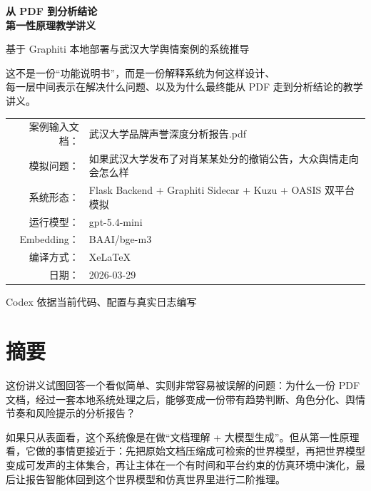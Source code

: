 \documentclass[UTF8,10pt,oneside]{ctexbook}
\begin{document}
\frontmatter

\begin{titlepage}
\centering
\vspace*{2.5cm}
{\Huge\bfseries 从 PDF 到分析结论\\[0.4em]第一性原理教学讲义\par}
\vspace{1cm}
{\Large 基于 Graphiti 本地部署与武汉大学舆情案例的系统推导\par}
\vspace{1.5cm}

\begin{tcolorbox}[width=0.88\textwidth,colback=SoftBlue,colframe=DeepBlue]
\centering
\large
这不是一份“功能说明书”，而是一份解释系统为何这样设计、\\
每一层中间表示在解决什么问题、以及为什么最终能从 PDF 走到分析结论的教学讲义。
\end{tcolorbox}

\vfill

\begin{tabular}{rl}
案例输入文档： & 武汉大学品牌声誉深度分析报告.pdf \\
模拟问题： & 如果武汉大学发布了对肖某某处分的撤销公告，大众舆情走向会怎么样 \\
系统形态： & Flask Backend + Graphiti Sidecar + Kuzu + OASIS 双平台模拟 \\
运行模型： & gpt-5.4-mini \\
Embedding： & BAAI/bge-m3 \\
编译方式： & XeLaTeX \\
日期： & 2026-03-29 \\
\end{tabular}

\vfill
{\large Codex 依据当前代码、配置与真实日志编写\par}
\end{titlepage}

\chapter*{摘要}

这份讲义试图回答一个看似简单、实则非常容易被误解的问题：为什么一份 PDF 文档，经过一套本地系统处理之后，能够变成一份带有趋势判断、角色分化、舆情节奏和风险提示的分析报告？

如果只从表面看，这个系统像是在做“文档理解 + 大模型生成”。但从第一性原理看，它做的事情更接近于：先把原始文档压缩成可检索的世界模型，再把世界模型变成可发声的主体集合，再让主体在一个有时间和平台约束的仿真环境中演化，最后让报告智能体回到这个世界模型和仿真世界里进行二阶推理。
\end{document}

